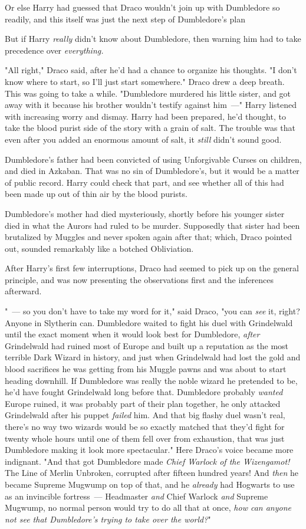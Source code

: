 Or else Harry had guessed that Draco wouldn't join up with Dumbledore so
readily, and this itself was just the next step of Dumbledore's plan{\el}

But if Harry \emph{really} didn't know about Dumbledore, then warning him had
to take precedence over \emph{everything.}

"All right," Draco said, after he'd had a chance to organize his thoughts. "I
don't know where to start, so I'll just start somewhere." Draco drew a deep
breath. This was going to take a while. "Dumbledore murdered his little sister,
and got away with it because his brother wouldn't testify against him~---"
\sbreak
Harry listened with increasing worry and dismay. Harry had been prepared, he'd
thought, to take the blood purist side of the story with a grain of salt. The
trouble was that even after you added an enormous amount of salt, it
\emph{still} didn't sound good.

Dumbledore's father had been convicted of using Unforgivable Curses on
children, and died in Azkaban. That was no sin of Dumbledore's, but it would be
a matter of public record. Harry could check that part, and see whether all of
this had been made up out of thin air by the blood purists.

Dumbledore's mother had died mysteriously, shortly before his younger sister
died in what the Aurors had ruled to be murder. Supposedly that sister had been
brutalized by Muggles and never spoken again after that; which, Draco pointed
out, sounded remarkably like a botched Obliviation.

After Harry's first few interruptions, Draco had seemed to pick up on the
general principle, and was now presenting the observations first and the
inferences afterward.

"~--- so you don't have to take my word for it," said Draco, "you can \emph{see}
it, right? Anyone in Slytherin can. Dumbledore waited to fight his duel with
Grindelwald until the exact moment when it would look best for Dumbledore,
\emph{after} Grindelwald had ruined most of Europe and built up a reputation as
the most terrible Dark Wizard in history, and just when Grindelwald had lost
the gold and blood sacrifices he was getting from his Muggle pawns and was
about to start heading downhill. If Dumbledore was really the noble wizard he
pretended to be, he'd have fought Grindelwald long before that. Dumbledore
probably \emph{wanted} Europe ruined, it was probably part of their plan
together, he only attacked Grindelwald after his puppet \emph{failed} him. And
that big flashy duel wasn't real, there's no way two wizards would be so
exactly matched that they'd fight for twenty whole hours until one of them fell
over from exhaustion, that was just Dumbledore making it look more
spectacular." Here Draco's voice became more indignant. "And that got
Dumbledore made \emph{Chief Warlock of the Wizengamot!} The Line of Merlin
Unbroken, corrupted after fifteen hundred years! And \emph{then} he became
Supreme Mugwump on top of that, and he \emph{already} had Hogwarts to use as an
invincible fortress~--- Headmaster \emph{and} Chief Warlock \emph{and} Supreme
Mugwump, no normal person would try to do all that at once, \emph{how can
anyone not see that Dumbledore's trying to take over the world?}"

